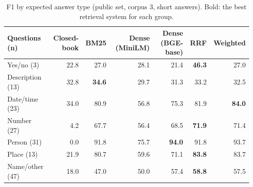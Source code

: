 \begin{table}[t]
\centering
\small
\begin{tabular}{lrrrrrr}
\toprule
Questions (n) & Closed-book & BM25 & Dense (MiniLM) & Dense (BGE-base) & RRF & Weighted \\
\midrule
Yes/no (3) & 22.8 & 27.0 & 28.1 & 21.4 & \textbf{46.3} & 27.0 \\
Description (13) & 32.8 & \textbf{34.6} & 29.7 & 31.3 & 33.2 & 32.5 \\
Date/time (23) & 34.0 & 80.9 & 56.8 & 75.3 & 81.9 & \textbf{84.0} \\
Number (27) & 4.2 & 67.7 & 56.4 & 68.5 & \textbf{71.9} & 71.4 \\
Person (31) & 0.0 & 91.8 & 75.7 & \textbf{94.0} & 91.8 & 93.7 \\
Place (13) & 21.9 & 80.7 & 59.6 & 71.1 & \textbf{83.8} & 83.7 \\
Name/other (47) & 18.0 & 47.0 & 50.0 & 57.4 & \textbf{58.8} & 57.5 \\
\bottomrule
\end{tabular}
\caption{F1 by expected answer type (public set, corpus 3, short answers). Bold: the best retrieval system for each group.}
\label{tab:by_type}
\end{table}
